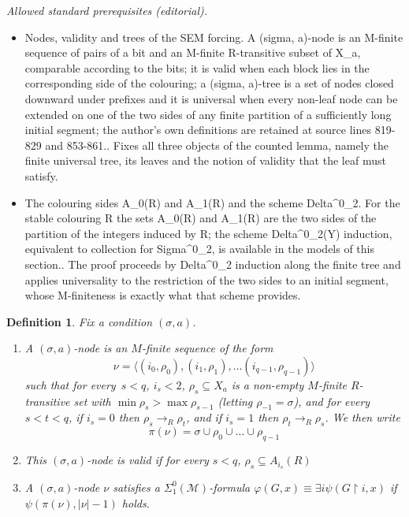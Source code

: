 \documentclass{article}
\numberwithin{theorem}{section}
\newtheorem{definition}[theorem]{Definition}
\newcommand{\M}{\mathcal{M}}
\newcommand{\uh}[0]{{\upharpoonright}}
\begin{document}
\noindent\textit{Allowed standard prerequisites (editorial).}\begin{itemize}
\item Nodes, validity and trees of the SEM forcing. A (sigma, a)-node is an M-finite sequence of pairs of a bit and an M-finite R-transitive subset of X\_a, comparable according to the bits; it is valid when each block lies in the corresponding side of the colouring; a (sigma, a)-tree is a set of nodes closed downward under prefixes and it is universal when every non-leaf node can be extended on one of the two sides of any finite partition of a sufficiently long initial segment; the author's own definitions are retained at source lines 819-829 and 853-861.. Fixes all three objects of the counted lemma, namely the finite universal tree, its leaves and the notion of validity that the leaf must satisfy.
\item The colouring sides A\_0(R) and A\_1(R) and the scheme Delta\textasciicircum{}0\_2. For the stable colouring R the sets A\_0(R) and A\_1(R) are the two sides of the partition of the integers induced by R; the scheme Delta\textasciicircum{}0\_2(Y) induction, equivalent to collection for Sigma\textasciicircum{}0\_2, is available in the models of this section.. The proof proceeds by Delta\textasciicircum{}0\_2 induction along the finite tree and applies universality to the restriction of the two sides to an initial segment, whose M-finiteness is exactly what that scheme provides.
\end{itemize}\medskip
\begin{definition}
Fix a condition $(\sigma, a)$.
\begin{enumerate}
    \item[(1)] A \emph{$(\sigma, a)$-node} is an $M$-finite sequence of the form
$$\nu = \langle (i_0, \rho_0), (i_1, \rho_1), \dots (i_{q-1}, \rho_{q-1}) \rangle$$ such that for every~$s < q$, $i_s < 2$, $\rho_s \subseteq X_a$ is a non-empty $M$-finite $R$-transitive set with $\min \rho_s > \max \rho_{s-1}$ (letting $\rho_{-1} = \sigma$), and for every~$s < t < q$, if $i_s = 0$ then $\rho_s \to_R \rho_t$, and if $i_s = 1$ then $\rho_t \to_R \rho_s$.
We then write $$\pi(\nu) = \sigma \cup \rho_0 \cup \dots \cup \rho_{q-1}$$
    \item[(2)] This $(\sigma, a)$-node is \emph{valid} if for every $s < q$, $\rho_s \subseteq A_{i_s}(R)$
    \item[(3)] A $(\sigma, a)$-node $\nu$ \emph{satisfies} a $\Sigma^0_1(\M)$-formula $\varphi(G, x) \equiv \exists i \psi(G \uh i, x)$  if $\psi(\pi(\nu), |\nu|-1)$ holds.
\end{enumerate}
\end{definition}
\end{document}
